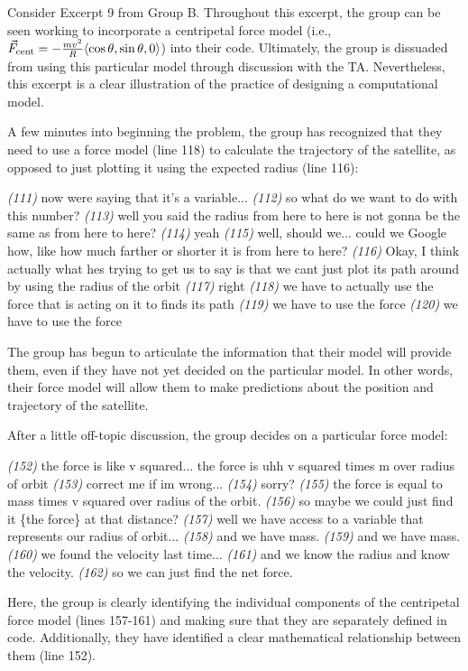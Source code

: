 \documentclass{msuphddissertation}
\begin{document}
\begin{doublespace}
Consider Excerpt 9 from Group B.  Throughout this excerpt, the group can be seen working to incorporate a centripetal force model (i.e., $\vec{F}_{\rm cent}=-\frac{mv^{2}}{R}\langle\cos\theta,\sin\theta,0\rangle$) into their code.  Ultimately, the group is dissuaded from using this particular model through discussion with the TA.  Nevertheless, this excerpt is a clear illustration of the practice of designing a computational model.

A few minutes into beginning the problem, the group has recognized that they need to use a force model (line 118) to calculate the trajectory of the satellite, as opposed to just plotting it using the expected radius (line 116): \begin{description}
\SA \textit{(111)} now were saying that it’s a variable...
\SA \textit{(112)} so what do we want to do with this number?
\SB \textit{(113)} well you said the radius from here to here is not gonna be the same as from here to here?
\SA \textit{(114)} yeah
\SB \textit{(115)} well, should we... could we Google how, like how much farther or shorter it is from here to here?		
\SD \textit{(116)} Okay, I think actually what hes trying to get us to say is that we cant just plot its path around by using the radius of the orbit
\SA \textit{(117)} right
\SD \textit{(118)} we have to actually use the force that is acting on it to finds its path
\SA \textit{(119)} we have to use the force
\SD \textit{(120)} we have to use the force\end{description}  The group has begun to articulate the information that their model will provide them, even if they have not yet decided on the particular model.  In other words, their force model will allow them to make predictions about the position and trajectory of the satellite.

After a little off-topic discussion, the group decides on a particular force model: \begin{description}
\SD \textit{(152)} the force is like v squared... the force is uhh v squared times m over radius of orbit
\SD \textit{(153)} correct me if im wrong...
\SA \textit{(154)} sorry?
\SD \textit{(155)} the force is equal to mass times v squared over radius of the orbit.
\SB \textit{(156)} so maybe we could just find it \{the force\} at that distance?
\SD \textit{(157)} well we have access to a variable that represents our radius of orbit...
\SB \textit{(158)} and we have mass.
\SD \textit{(159)} and we have mass.
\SC \textit{(160)} we found the velocity last time...
\SB \textit{(161)} and we know the radius and know the velocity.
\SB \textit{(162)} so we can just find the net force.\end{description}  Here, the group is clearly identifying the individual components of the centripetal force model (lines 157-161) and making sure that they are separately defined in code.  Additionally, they have identified a clear mathematical relationship between them (line 152).


\end{doublespace}
\end{document}
